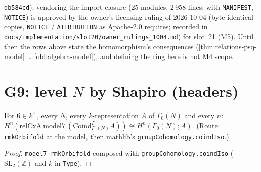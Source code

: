 \begin{remark}
\begin{itemize}
      \texttt{db584cd}); vendoring the import closure (25 modules, 2\,958 lines, with \texttt{MANIFEST}, \texttt{NOTICE}) is approved by the owner's licensing ruling of
      2026-10-04 (byte-identical copies, \texttt{NOTICE} / \texttt{ATTRIBUTION} as Apache-2.0 requires; recorded in
      \texttt{docs/implementation/slot20/owner\_rulings\_1004.md}) for slot~21 (M5). Until then the rows above state the homomorphism's consequences (\ref{thm:relations-psq-model} … \ref{obl:algebra-model}), and
      defining the ring here is not M4 scope.
  \end{itemize}
\end{remark}

\section{G9: level \texorpdfstring{$N$}{N} by Shapiro (headers)}

\begin{proposition}\label{prop:levelN-shapiro-model}
  \leanok
  For $6\in k^\times$, every $N$, every $k$-representation $A$ of $\Gamma_0(N)$ and every $n$:
  $H^n(\mathrm{relCxA}\ \mathrm{model7}\ (\mathrm{Coind}_{\Gamma_0(N)}^{\Gamma}A))\cong H^n(\Gamma_0(N);A)$. (Route:
  \texttt{rmkOrbifold} at the model, then mathlib's \texttt{groupCohomology.coindIso}.)
\end{proposition}
\begin{proof}
  \leanok
  \texttt{model7\_rmkOrbifold} composed with \texttt{groupCohomology.coindIso} ($\mathrm{SL}_2(\mathbb Z)$ and $k$ in \texttt{Type}).
\end{proof}

